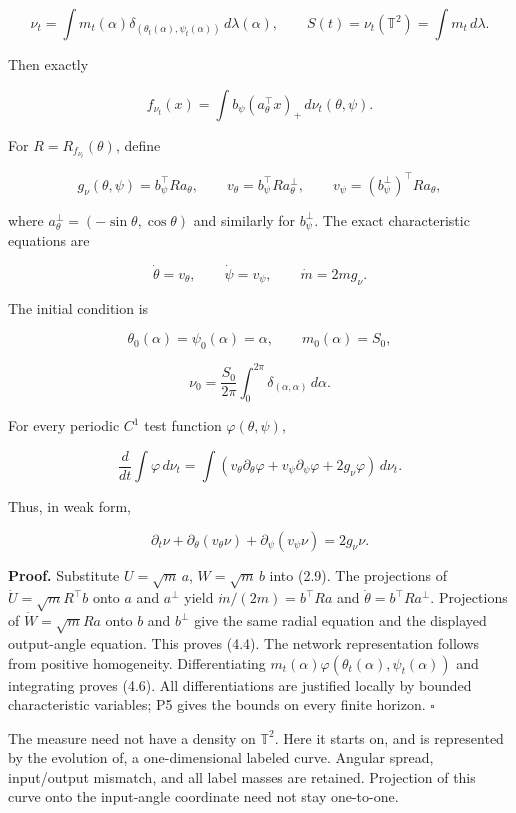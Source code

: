 \documentclass[
  10pt,
]{article}
\begin{document}
\[
 \nu_t=\int m_t(\alpha)
 \delta_{(\theta_t(\alpha),\psi_t(\alpha))}\,d\lambda(\alpha),
 \qquad S(t)=\nu_t(\mathbb T^2)=\int m_t\,d\lambda.
 \tag{4.1}
\]

Then exactly

\[
 f_{\nu_t}(x)=\int b_\psi(a_\theta^\top x)_+\,d\nu_t(\theta,\psi).
 \tag{4.2}
\]

For \(R=R_{f_{\nu_t}}(\theta)\), define

\[
 g_\nu(\theta,\psi)=b_\psi^\top R a_\theta,\qquad
 v_\theta=b_\psi^\top R a_\theta^\perp,\qquad
 v_\psi=(b_\psi^\perp)^\top R a_\theta,
 \tag{4.3}
\]

where \(a_\theta^\perp=(-\sin\theta,\cos\theta)\) and similarly for
\(b_\psi^\perp\). The exact characteristic equations are

\[
 \boxed{\dot\theta=v_\theta,\qquad
 \dot\psi=v_\psi,\qquad \dot m=2mg_\nu.}
 \tag{4.4}
\]

The initial condition is

\[
 \theta_0(\alpha)=\psi_0(\alpha)=\alpha,\qquad m_0(\alpha)=S_0,
\]

\[
 \nu_0=\frac{S_0}{2\pi}\int_0^{2\pi}\delta_{(\alpha,\alpha)}\,d\alpha.
 \tag{4.5}
\]

For every periodic \(C^1\) test function \(\varphi(\theta,\psi)\),

\[
 \frac d{dt}\int\varphi\,d\nu_t
 =\int(v_\theta\partial_\theta\varphi+
 v_\psi\partial_\psi\varphi+2g_\nu\varphi)\,d\nu_t.
 \tag{4.6}
\]

Thus, in weak form,

\[
 \partial_t\nu+\partial_\theta(v_\theta\nu)
 +\partial_\psi(v_\psi\nu)=2g_\nu\nu.
 \tag{4.7}
\]

\textbf{Proof.} Substitute \(U=\sqrt m\,a\), \(W=\sqrt m\,b\) into
(2.9). The projections of \(\dot U=\sqrt m R^\top b\) onto \(a\) and
\(a^\perp\) yield \(\dot m/(2m)=b^\top Ra\) and
\(\dot\theta=b^\top Ra^\perp\). Projections of \(\dot W=\sqrt m Ra\)
onto \(b\) and \(b^\perp\) give the same radial equation and the
displayed output-angle equation. This proves (4.4). The network
representation follows from positive homogeneity. Differentiating
\(m_t(\alpha)\varphi(\theta_t(\alpha),\psi_t(\alpha))\) and integrating
proves (4.6). All differentiations are justified locally by bounded
characteristic variables; P5 gives the bounds on every finite horizon.
\(\square\)

The measure need not have a density on \(\mathbb T^2\). Here it starts
on, and is represented by the evolution of, a one-dimensional labeled
curve. Angular spread, input/output mismatch, and all label masses are
retained. Projection of this curve onto the input-angle coordinate need
not stay one-to-one.
\end{document}
